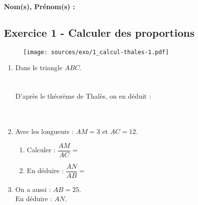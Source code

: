 \documentclass[12pt]{article}
\begin{document}

\setlength{\columnseprule}{1pt}

\textbf{Nom(s), Prénom(s) :}

\begin{multicols}{2}
\subsection*{Exercice 1 - Calculer des proportions}

  \begin{figure}[H]
    \centering
    \texttt{[image: sources/exo/1\_calcul-thales-1.pdf]}
  \end{figure}


  \begin{enumerate}
  \item[1.] Dans le triangle $ABC$.\\ 
    \phantom{abc}\\
    \phantom{abc}\\
    D'après le théorème de Thalès, on en déduit :\\
    \phantom{abc}\\
    \phantom{abc}\\
    
  \item[2.] Avec les longueurs : $AM = 3$ et $AC = 12$.
    \begin{enumerate}
    \item[a)] Calculer : $\dfrac{AM}{AC} = $\\
    \item[b)] En déduire : $\dfrac{AN}{AB} = $\\
    \end{enumerate}

  \item[3.] On a aussi : $AB = 25$.\\
    En déduire : $AN$.\\
  \end{enumerate}
\end{multicols}

\vspace{0.8cm}
\noindent\hrulefill
\vspace{0.8cm}
\end{document}
